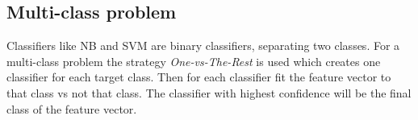 \subsection{Multi-class problem}
Classifiers like NB and SVM are binary classifiers, separating two classes. For a multi-class problem the strategy \emph{One-vs-The-Rest} is used which creates one classifier for each target class. Then for each classifier fit the feature vector to that class vs not that class. The classifier with highest confidence will be the final class of the feature vector.
